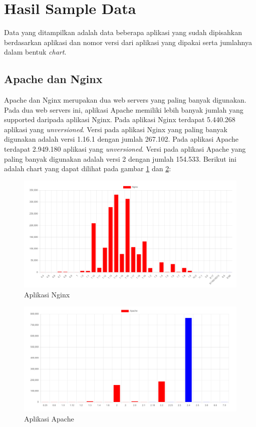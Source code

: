\section{Hasil Sample Data}
Data yang ditampilkan adalah data beberapa aplikasi yang sudah dipisahkan berdasarkan aplikasi dan nomor versi dari aplikasi yang dipakai serta jumlahnya dalam bentuk \textit{chart}.

\subsection{Apache dan Nginx}
Apache dan Nginx merupakan dua web servers yang paling banyak digunakan. Pada dua web servers ini, aplikasi Apache memiliki lebih banyak jumlah yang supported daripada aplikasi Nginx. Pada aplikasi Nginx terdapat 5.440.268 aplikasi yang \textit{unversioned}. Versi pada aplikasi Nginx yang paling banyak digunakan adalah versi 1.16.1 dengan jumlah 267.102. Pada aplikasi Apache terdapat 2.949.180 aplikasi yang \textit{unversioned}. Versi pada aplikasi Apache yang paling banyak digunakan adalah versi 2 dengan jumlah 154.533. Berikut ini adalah chart yang dapat dilihat pada gambar \ref{fig:data_sample_nginx} dan \ref{fig:data_sample_apache}:
\begin{figure}[H]
	\centering  
	\includegraphics[scale=0.7]{Gambar/data_sample_nginx.png}  
	\caption{Aplikasi Nginx} 
	\label{fig:data_sample_nginx} 
\end{figure}

\begin{figure}[H]
	\centering  
	\includegraphics[scale=0.7]{Gambar/apache.png}  
	\caption{Aplikasi Apache} 
	\label{fig:data_sample_apache} 
\end{figure}

